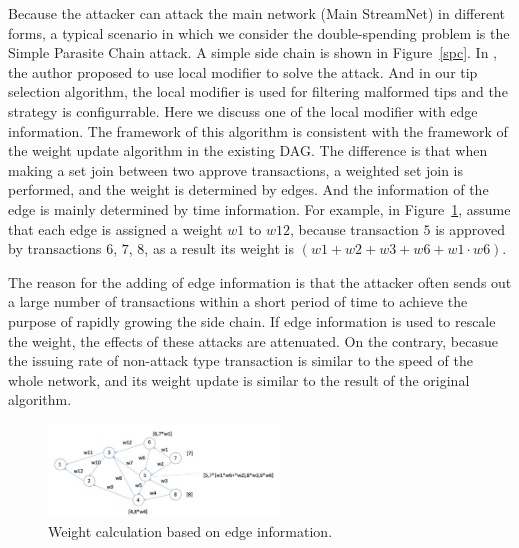 Because the attacker can attack the main network (Main StreamNet) in different forms,
a typical scenario in which we consider the double-spending problem is the Simple Parasite Chain attack.
A simple side chain is shown in Figure~\ref{spc}. 
In \cite{iota_proof}, the author proposed to use local modifier to solve the attack. And in our tip selection algorithm, 
the local modifier is used for filtering malformed tips and the strategy is configurrable. 
Here we discuss one of the local modifier with edge information.
The framework of this algorithm is consistent with the framework of the weight update algorithm in the existing DAG.
The difference is that when making a set join between two approve transactions, a weighted set join is performed, and the weight is determined by edges. 
And the information of the edge is mainly determined by time information. 
For example, in Figure~\ref{edge_info}, assume that each edge is assigned a weight $w1$ to $w12$, 
because transaction $5$ is approved by transactions $6$, $7$, $8$, as a result its weight is $(w1+w2+w3+w6+w1 \cdot w6)$.

The reason for the adding of edge information is that the attacker often sends out a large number of transactions 
within a short period of time to achieve the purpose of rapidly growing the side chain. 
If edge information is used to rescale the weight, the effects of these attacks are attenuated. 
On the contrary, becasue the issuing rate of non-attack type transaction is similar to the speed of the whole network,
and its weight update is similar to the result of the original algorithm.

\begin{figure}[!ht]
\begin{center}
\includegraphics[width=0.55\textwidth]{figures/edge_info.png}
    \caption{
        Weight calculation based on edge information.
     }
\label{edge_info}
\end{center}
\end{figure}

